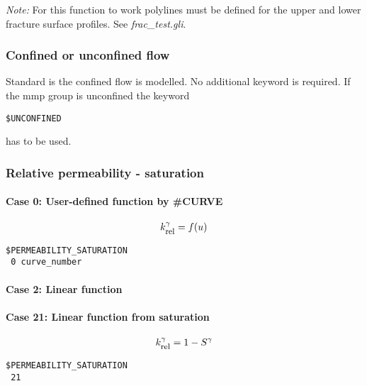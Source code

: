 \emph{Note:} For this function to work polylines must be defined for the upper and lower fracture surface profiles. See \emph{frac\_test.gli}.

\subsubsection{Confined or unconfined flow}
Standard is the confined flow is modelled. No additional keyword
is required. If the mmp group is unconfined the keyword
\begin{verbatim}
$UNCONFINED
\end{verbatim}
has to be used.
\subsubsection{Relative permeability - saturation}


\paragraph*{Case 0: User-defined function by \#CURVE}
\begin{eqnarray}
  k_{\mbox{\footnotesize rel}}^\gamma= f(u)
\end{eqnarray}
\begin{verbatim}
$PERMEABILITY_SATURATION
 0 curve_number
\end{verbatim}

\paragraph*{Case 2: Linear function}

\paragraph*{Case 21: Linear function from saturation}
\begin{eqnarray}
k_{\mbox{\footnotesize rel}}^\gamma = 1-S^\gamma
\end{eqnarray}
\begin{verbatim}
$PERMEABILITY_SATURATION
 21
\end{verbatim}


